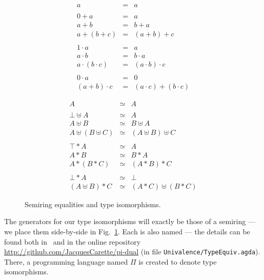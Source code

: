 \documentclass[sigplan,review,anonymous]{acmart}\settopmatter{printfolios=true,printccs=false,printacmref=false}
\newcommand{\presumtype}{\uplus}
\newcommand{\preprodtype}{*}
\begin{document}
\begin{figure}[t]
\begin{minipage}{0.48\textwidth}
\[\begin{array}{rcl}
a &=& a \\
\\
0 + a &=& a \\
a + b &=& b + a \\
a + (b + c) &=& (a + b) + c \\
\\
1 \cdot a &=& a \\
a \cdot b &=& b \cdot a \\
a \cdot (b \cdot c) &=& (a \cdot b) \cdot c \\
\\
0 \cdot a &=& 0 \\
(a + b) \cdot c &=& (a \cdot c) + (b \cdot c)
\end{array}\]
\end{minipage}
\begin{minipage}{0.48\textwidth}
\[
\begin{array}{rrcll}
& A & \simeq & A &\\
\\
&  \bot \presumtype A & \simeq & A &\\
&  A \presumtype B & \simeq & B \presumtype A &\\
&  A \presumtype (B \presumtype C) & \simeq & (A \presumtype B) \presumtype C &\\
\\
&  \top \preprodtype A & \simeq & A &\\
&  A \preprodtype B & \simeq & B \preprodtype A &\\
&  A \preprodtype (B \preprodtype C) & \simeq & (A \preprodtype B) \preprodtype C &\\
\\
& \bot \preprodtype A & \simeq & \bot &\\
& (A \presumtype B) \preprodtype C & \simeq & (A \preprodtype C) \presumtype (B \preprodtype C) &
\end{array}
\]
\end{minipage}
\caption{Semiring equalities and type isomorphisms.}
\label{type-isos}
\end{figure}

The generators for our type isomorphisms will exactly be those
of a semiring --- we place them side-by-side in
Fig.~\ref{type-isos}.  Each is also named --- the details can be found
both in~\cite{Carette2016,Carette2018} and in the online repository
\url{http://github.com/JacquesCarette/pi-dual} (in file
\texttt{Univalence/TypeEquiv.agda}).  There, a programming
language named $\Pi$ is created to denote type isomorphisms.
\end{document}
